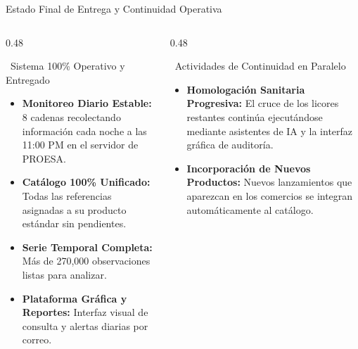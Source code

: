 \documentclass[aspectratio=169, 10pt]{beamer}
\begin{document}
\begin{frame}{Estado Final de Entrega y Continuidad Operativa}
    \begin{columns}[T]
        \begin{column}{0.48\textwidth}
            \begin{block}{\faCheckCircle\ Sistema 100\% Operativo y Entregado}
                \begin{itemize}
                    \setlength{\itemsep}{5pt}
                    \item \textbf{Monitoreo Diario Estable:} 8 cadenas recolectando información cada noche a las 11:00 PM en el servidor de PROESA.
                    \item \textbf{Catálogo 100\% Unificado:} Todas las referencias asignadas a su producto estándar sin pendientes.
                    \item \textbf{Serie Temporal Completa:} Más de 270,000 observaciones listas para analizar.
                    \item \textbf{Plataforma Gráfica y Reportes:} Interfaz visual de consulta y alertas diarias por correo.
                \end{itemize}
            \end{block}
        \end{column}

        \begin{column}{0.48\textwidth}
            \begin{alertblock}{\faSync\ Actividades de Continuidad en Paralelo}
                \begin{itemize}
                    \setlength{\itemsep}{5pt}
                    \item \textbf{Homologación Sanitaria Progresiva:} El cruce de los licores restantes continúa ejecutándose mediante asistentes de IA y la interfaz gráfica de auditoría.
                    \item \textbf{Incorporación de Nuevos Productos:} Nuevos lanzamientos que aparezcan en los comercios se integran automáticamente al catálogo.
                \end{itemize}
            \end{alertblock}
        \end{column}
    \end{columns}
\end{frame}
\end{document}
